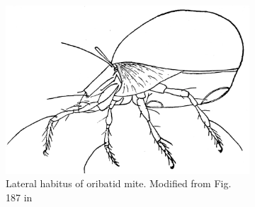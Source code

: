 \documentclass[letterpaper, 11pt]{article}
\begin{document}
\begin{figure}[ht!]
    \centering
    \begin{subfigure}[ht!]{0.45\textwidth}
        \includegraphics[width=\textwidth]{oribatid.png}
        \caption{Lateral habitus of oribatid mite. Modified from Fig. 187 in \cite{bhlitem132773acari}}
        \label{fig:mite1}
    \end{subfigure}
    ~ %
    \begin{subfigure}[ht!]{0.2\textwidth}

\end{subfigure}
\end{figure}
\end{document}

